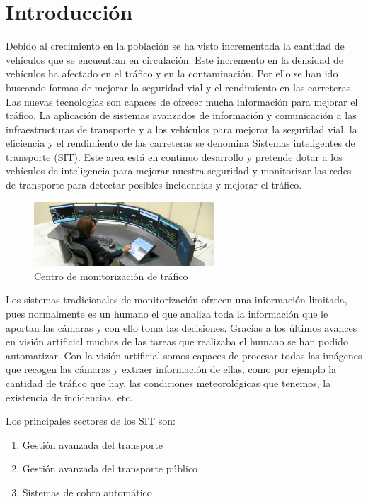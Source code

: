 \chapter{Introducción}\label{cap.introduccion}

Debido al crecimiento en la población se ha visto incrementada la cantidad de vehículos que se encuentran en circulación. Este incremento en la densidad de vehículos ha afectado en el tráfico y en la contaminación. Por ello se han ido buscando formas de mejorar la seguridad vial y el rendimiento en las carreteras. Las nuevas tecnologías son capaces de ofrecer mucha información para mejorar el tráfico. La aplicación de sistemas avanzados de información y comunicación a las infraestructuras de transporte y a los vehículos para mejorar la seguridad vial, la eficiencia y el rendimiento de las carreteras se denomina Sistemas inteligentes de transporte (SIT). Este area está en continuo desarrollo y pretende dotar a los vehículos de inteligencia para mejorar nuestra seguridad y monitorizar las redes de transporte para detectar posibles incidencias y mejorar el tráfico.


\begin{figure}[H]
  \begin{center}
    \includegraphics[width=0.6\textwidth]{figures/Introduccion/Indra.jpg}
		\caption{Centro de monitorización de tráfico}
		\label{fig.monitorizacion}
		\end{center}
\end{figure}

Los sistemas tradicionales de monitorización ofrecen una información limitada, pues normalmente es un humano el que analiza toda la información que le aportan las cámaras y con ello toma las decisiones. Gracias a los últimos avances en visión artificial muchas de las tareas que realizaba el humano se han podido automatizar. Con la visión artificial somos capaces de procesar todas las imágenes que recogen las cámaras y extraer información de ellas, como por ejemplo la cantidad de tráfico que hay, las condiciones meteorológicas que tenemos, la existencia de incidencias, etc.

Los principales sectores de los SIT son:
\begin{enumerate}
    \item Gestión avanzada del transporte
    \item Gestión avanzada del transporte público
    \item Sistemas de cobro automático
\end{enumerate}

